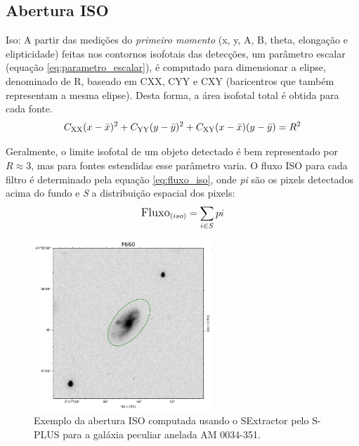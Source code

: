 \subsection{Abertura ISO}
Iso: A partir das medições do \emph{primeiro momento} (x, y, A, B, theta, elongação e elipticidade) feitas nos contornos isofotais das detecções, um parâmetro escalar (equação \ref{eq:parametro_escalar}), é computado para dimensionar a elipse, denominado de R, baseado em CXX, CYY e CXY (baricentros que também representam a mesma elipse). Desta forma, a área isofotal total é obtida para cada fonte.
\newcommand{\CXX}{C_{\text{XX}}}
\newcommand{\CYY}{C_{\text{YY}}}
\newcommand{\CXY}{C_{\text{XY}}}
\begin{equation} \label{eq:parametro_escalar}
\large
\CXX(x-\bar{x})^2 + \CYY(y-\bar{y})^2 + \CXY(x-\bar{x})(y-\bar{y}) = R^2
\end{equation}

Geralmente, o limite isofotal de um objeto detectado é bem representado por $R \approx 3$, mas para fontes estendidas esse parâmetro varia. O fluxo ISO para cada filtro é determinado pela equação \ref{eq:fluxo_iso}, onde \emph{pi} são os pixels detectados acima do fundo e \emph{S} a distribuição espacial dos pixels:
\begin{equation} \label{eq:fluxo_iso}
\large
\text{Fluxo}_{(iso)} = \sum_{i \in S} pi
\end{equation}

\begin{figure}[h]
  \centering 
  \includegraphics[width=0.6\textwidth]{Imagens/iso_exemplo.png} 
  \caption[Exemplo da abertura ISO para a galáxia AM 0034-351.]{Exemplo da abertura ISO computada usando o SExtractor pelo S-PLUS para a galáxia peculiar anelada AM 0034-351.}
  \label{fig:iso_exemplo} 
\end{figure}

